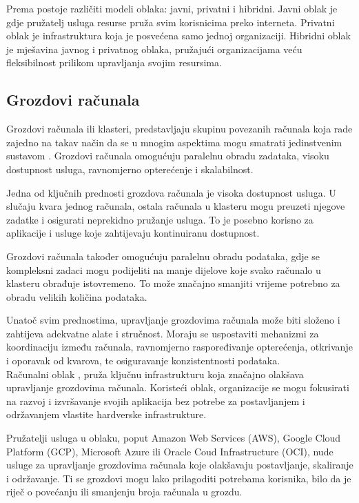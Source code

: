 \documentclass[times, utf8, diplomski]{fer}
\begin{document}
Prema \citet{zarko_raspodijeljeni_2013} postoje različiti modeli oblaka: javni, privatni i hibridni. Javni oblak je gdje pružatelj usluga resurse pruža svim korisnicima preko interneta. Privatni oblak je infrastruktura koja je posvećena samo jednoj organizaciji. Hibridni oblak je mješavina javnog i privatnog oblaka, pružajući organizacijama veću fleksibilnost prilikom upravljanja svojim resursima.

\subsection{Grozdovi računala}

Grozdovi računala ili klasteri, predstavljaju skupinu povezanih računala koja rade zajedno na takav način da se u mnogim aspektima mogu smatrati jedinstvenim sustavom \citep{zarko_raspodijeljeni_2013}. Grozdovi računala omogućuju paralelnu obradu zadataka, visoku dostupnost usluga, ravnomjerno opterećenje i skalabilnost.

Jedna od ključnih prednosti grozdova računala je visoka dostupnost usluga. U slučaju kvara jednog računala, ostala računala u klasteru mogu preuzeti njegove zadatke i osigurati neprekidno pružanje usluga. To je posebno korisno za aplikacije i usluge koje zahtijevaju kontinuiranu dostupnost.

Grozdovi računala također omogućuju paralelnu obradu podataka, gdje se kompleksni zadaci mogu podijeliti na manje dijelove koje svako računalo u klasteru obrađuje istovremeno. To može značajno smanjiti vrijeme potrebno za obradu velikih količina podataka.

Unatoč svim prednostima, upravljanje grozdovima računala može biti složeno i zahtijeva adekvatne alate i stručnost. Moraju se uspostaviti mehanizmi za koordinaciju između računala, ravnomjerno raspoređivanje opterećenja, otkrivanje i oporavak od kvarova, te osiguravanje konzistentnosti podataka. \\

Računalni oblak , pruža ključnu infrastrukturu koja značajno olakšava upravljanje grozdovima računala. Koristeći oblak, organizacije se mogu fokusirati na razvoj i izvršavanje svojih aplikacija bez potrebe za postavljanjem i održavanjem vlastite hardverske infrastrukture.

Pružatelji usluga u oblaku, poput Amazon Web Services (AWS), Google Cloud Platform (GCP), Microsoft Azure ili Oracle Coud Infrastructure (OCI), nude usluge za upravljanje grozdovima računala koje olakšavaju postavljanje, skaliranje i održavanje. Ti se grozdovi mogu lako prilagoditi potrebama korisnika, bilo da je riječ o povećanju ili smanjenju broja računala u grozdu.
\end{document}
